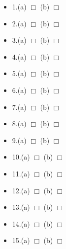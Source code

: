 \documentclass[12pt]{article}
\begin{document}
\begin{minipage}[t]{\textwidth}
\begin{multicols}{2}
\begin{mdframed}
\begin{multicols}{2}
\begin{itemize}
	\setlength\itemsep{0em}	
	\item{1.(a) $\Box$ \hspace{0.2cm} (b) $\Box$}
	\item{2.(a) $\Box$ \hspace{0.2cm} (b) $\Box$}
	\item{3.(a) $\Box$ \hspace{0.2cm} (b) $\Box$}
	\item{4.(a) $\Box$ \hspace{0.2cm} (b) $\Box$}
	\item{5.(a) $\Box$ \hspace{0.2cm} (b) $\Box$}
	\item{6.(a) $\Box$ \hspace{0.2cm} (b) $\Box$}
	\item{7.(a) $\Box$ \hspace{0.2cm} (b) $\Box$}
	\item{8.(a) $\Box$ \hspace{0.2cm} (b) $\Box$}
	\item{9.(a) $\Box$ \hspace{0.2cm} (b) $\Box$}
	\item{10.(a) $\Box$ \hspace{0.2cm} (b) $\Box$}
	\item{11.(a) $\Box$ \hspace{0.2cm} (b) $\Box$}
	\item{12.(a) $\Box$ \hspace{0.2cm} (b) $\Box$}
	\item{13.(a) $\Box$ \hspace{0.2cm} (b) $\Box$}
	\item{14.(a) $\Box$ \hspace{0.2cm} (b) $\Box$}
	\item{15.(a) $\Box$ \hspace{0.2cm} (b) $\Box$}
\end{itemize}
\columnbreak


\end{multicols}
\end{mdframed}
\end{multicols}
\end{minipage}
\end{document}
